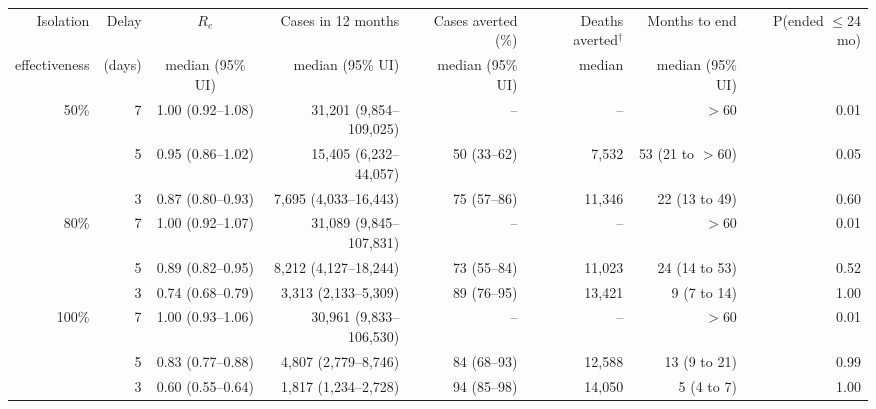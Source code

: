 \begin{tabular}{@{}rrcrrrrr@{}}
\toprule
Isolation & Delay & $R_e$ & Cases in 12 months & Cases averted (\%) & Deaths averted$^\dagger$ & Months to end & P(ended $\le$24 mo) \\
effectiveness & (days) & median (95\% UI) & median (95\% UI) & median (95\% UI) & median & median (95\% UI) &  \\
\midrule
50\% & 7 & 1.00 (0.92--1.08) & 31,201 (9,854--109,025) & -- & -- & $>$60 & 0.01 \\
 & 5 & 0.95 (0.86--1.02) & 15,405 (6,232--44,057) & 50 (33--62) & 7,532 & 53 (21 to $>$60) & 0.05 \\
 & 3 & 0.87 (0.80--0.93) & 7,695 (4,033--16,443) & 75 (57--86) & 11,346 & 22 (13 to 49) & 0.60 \\
\midrule
80\% & 7 & 1.00 (0.92--1.07) & 31,089 (9,845--107,831) & -- & -- & $>$60 & 0.01 \\
 & 5 & 0.89 (0.82--0.95) & 8,212 (4,127--18,244) & 73 (55--84) & 11,023 & 24 (14 to 53) & 0.52 \\
 & 3 & 0.74 (0.68--0.79) & 3,313 (2,133--5,309) & 89 (76--95) & 13,421 & 9 (7 to 14) & 1.00 \\
\midrule
100\% & 7 & 1.00 (0.93--1.06) & 30,961 (9,833--106,530) & -- & -- & $>$60 & 0.01 \\
 & 5 & 0.83 (0.77--0.88) & 4,807 (2,779--8,746) & 84 (68--93) & 12,588 & 13 (9 to 21) & 0.99 \\
 & 3 & 0.60 (0.55--0.64) & 1,817 (1,234--2,728) & 94 (85--98) & 14,050 & 5 (4 to 7) & 1.00 \\
\bottomrule
\end{tabular}
